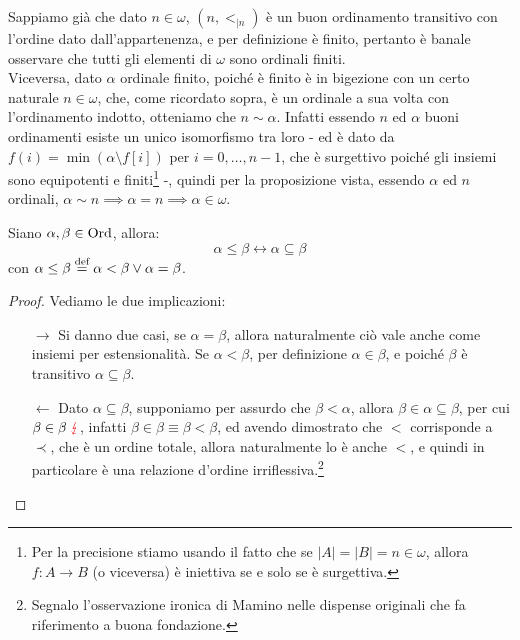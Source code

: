 \begin{soln}
	Sappiamo già che dato $n \in \omega$, $(n,<_{|n})$ è un buon ordinamento transitivo con l'ordine dato dall'appartenenza, e per definizione è finito, pertanto è banale osservare che tutti gli elementi di $\omega$ sono ordinali finiti.\\
	Viceversa, dato $\alpha$ ordinale finito, poiché è finito è in bigezione con un certo naturale $n \in \omega$, che, come ricordato sopra, è un ordinale a sua volta con l'ordinamento indotto, otteniamo che $n \sim \alpha$. Infatti essendo $n$ ed $\alpha$
	buoni ordinamenti esiste un unico isomorfismo tra loro - ed è dato da $f(i) = \min(\alpha \setminus f[i])$ per $i = 0,\ldots,n-1$, che è surgettivo poiché gli insiemi sono equipotenti e finiti\footnote{Per la precisione stiamo usando il fatto che se $|A| = |B| = n \in \omega$, allora 
	$f : A \to B$ (o viceversa) è iniettiva se e solo se è surgettiva.} -, quindi per la proposizione vista, essendo $\alpha$ ed $n$ ordinali,
	$\alpha \sim n \implies \alpha = n \implies \alpha \in \omega$.
\end{soln}

\begin{proposition}
	Siano $\alpha,\beta \in \operatorname{Ord}$, allora:
	\[ \alpha \leq \beta \leftrightarrow \alpha \subseteq \beta
		\]
	con $\alpha \leq \beta \overset{\text{def}}{=} \alpha < \beta \lor \alpha = \beta$.
\end{proposition}

\begin{proof}
	Vediamo le due implicazioni:
	\begin{itemize}
		\item[$\boxed{\longrightarrow}$] Si danno due casi, se $\alpha = \beta$, allora naturalmente ciò vale anche come insiemi per estensionalità. Se $\alpha < \beta$, per definizione $\alpha \in \beta$,
		e poiché $\beta$ è transitivo $\alpha \subseteq \beta$.
		\item[$\boxed{\longleftarrow}$] Dato $\alpha \subseteq \beta$, supponiamo per assurdo che $\beta < \alpha$, allora $\beta \in \alpha \subseteq \beta$, per cui $\beta \in \beta \;\textcolor{red}{\lightning}$,
		infatti $\beta \in \beta \equiv \beta < \beta$, ed avendo dimostrato che $<$ corrisponde a $\prec$, che è un ordine totale, allora naturalmente lo è anche $<$, e quindi in particolare è una relazione d'ordine irriflessiva.\footnote{Segnalo l'osservazione ironica di Mamino nelle dispense originali che fa riferimento a buona fondazione.}
	\end{itemize}
\end{proof}

